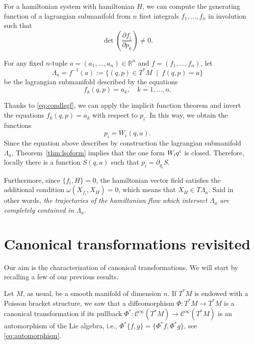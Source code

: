 \documentclass[english,fontsize=11pt,paper=a5,oneside]{scrbook}
\newcommand{\cC}{\mathcal{C}}
\newcommand{\R}{\mathbb{R}}
\let\d\relax
\newcommand{\d}{\mathrm{d}}
\theoremstyle{definition}
\newenvironment{remark}
  {\pushQED{\qed}\renewcommand{\qedsymbol}{$\lozenge$}\remarkx}
  {\popQED\endremarkx}
\begin{document}
\begin{remark}\label{rmk:nfils}
  For a hamiltonian system with hamiltonian $H$, we can compute the generating function of a lagrangian submanifold from $n$ first integrals $f_1, \ldots, f_n$ in involution such that
  \begin{equation}\label{eq:condlsgf}
    \det\left(\frac{\partial f_i}{\partial p_k}\right) \neq 0.
  \end{equation}

  For any fixed $n$-tuple $a = (a_1, \ldots, a_n) \in \R^n$ and $f=(f_1,\ldots,f_n)$, let
  \begin{equation}
    \Lambda_a = f^{-1}(a) := \{(q,p)\in T^*M \;\mid\; f(q,p) = a\}
  \end{equation}
  be the lagrangian submanifold described by the equations
  \begin{equation}
    f_k(q,p) = a_k, \quad k=1,\ldots,n.
  \end{equation}

  Thanks to \eqref{eq:condlsgf}, we can apply the implicit function theorem and invert the equations $f_k(q,p) = a_k$ with respect to $p_i$. In this way, we obtain the functions
  \begin{equation}
    p_i = W_i(q,a).
  \end{equation}
  Since the equation above describes by construction the lagrangian submanifold $\Lambda_a$, Theorem~\ref{thm:lsoform} implies that the one form $W_i\d q^i$ is closed.
  Therefore, locally there is a function $S(q, a)$ such that $p_i = \partial_{q_i} S$.

  Furthermore, since $\big\{f_i, H\big\} = 0$, the hamiltonian vector field satisfies the additional condition $\omega(X_{f_i}, X_H) = 0$, which means that $X_H\in T\Lambda_a$. Said in other words, \emph{the trajectories of the hamiltonian flow which intersect $\Lambda_a$ are completely contained in $\Lambda_a$}.
\end{remark}

\section{Canonical transformations revisited}

Our aim is the characterization of canonical transformations.
We will start by recalling a few of our previous results.

Let $M$, as usual, be a smooth manifold of dimension $n$.
%
If $T^*M$ is endowed with a Poisson bracket structure, we saw that a diffeomorphism $\Phi:T^*M\to T^*M$ is a canonical transformation if its pullback $\Phi^*:\cC^\infty(T^*M)\to\cC^\infty(T^*M)$ is an automorphism of the Lie algebra, i.e., $\Phi^*\big\{f,g\big\} = \big\{\Phi^* f, \Phi^* g\big\}$, see \eqref{eq:automorphism}.
\end{document}
